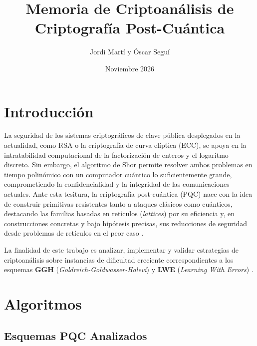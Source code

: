 \documentclass[12pt,a4paper]{article}
\title{\vspace{-1.4cm}\textbf{Memoria de Criptoanálisis de Criptografía Post-Cuántica}}
\author{Jordi Martí y Óscar Seguí}
\date{\vspace{-0.4cm}Noviembre 2026}
\begin{document}
\maketitle
\vspace{-0.6cm}

\section{Introducción}

La seguridad de los sistemas criptográficos de clave pública desplegados en la actualidad, como RSA o la criptografía de curva elíptica (ECC), se apoya en la intratabilidad computacional de la factorización de enteros y el logaritmo discreto. Sin embargo, el algoritmo de Shor permite resolver ambos problemas en tiempo polinómico con un computador cuántico lo suficientemente grande, comprometiendo la confidencialidad y la integridad de las comunicaciones actuales. Ante esta tesitura, la criptografía post-cuántica (PQC) nace con la idea de construir primitivas resistentes tanto a ataques clásicos como cuánticos, destacando las familias basadas en retículos (\textit{lattices}) por su eficiencia y, en construcciones concretas y bajo hipótesis precisas, sus reducciones de seguridad desde problemas de retículos en el peor caso \cite{regev2009}.

La finalidad de este trabajo es analizar, implementar y validar estrategias de criptoanálisis sobre instancias de dificultad creciente correspondientes a los esquemas \textbf{GGH} (\textit{Goldreich-Goldwasser-Halevi}) \cite{ggh1997} y \textbf{LWE} (\textit{Learning With Errors}) \cite{regev2009}.

\section{Algoritmos}

\subsection{Esquemas PQC Analizados}
\end{document}

